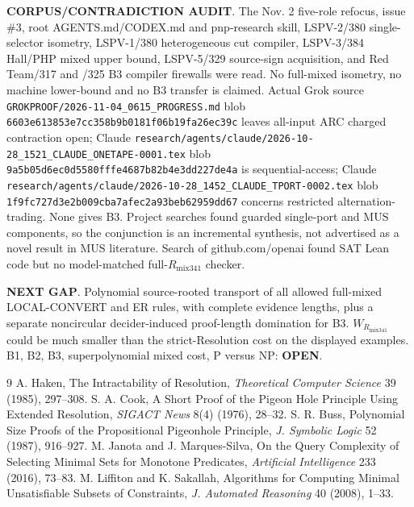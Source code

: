 \documentclass[11pt]{article}
\begin{document}
\noindent\textbf{CORPUS/CONTRADICTION AUDIT}. The Nov. 2 five-role refocus, issue \#3, root AGENTS.md/CODEX.md and pnp-research skill, LSPV-2/380 single-selector isometry, LSPV-1/380 heterogeneous cut compiler, LSPV-3/384 Hall/PHP mixed upper bound, LSPV-5/329 source-sign acquisition, and Red Team/317 and /325 B3 compiler firewalls were read. No full-mixed isometry, no machine lower-bound and no B3 transfer is claimed. Actual Grok source \texttt{GROKPROOF/2026-11-04\_0615\_PROGRESS.md} blob \texttt{6603e613853e7cc358b9b0181f06b19fa26ec39c} leaves all-input ARC charged contraction open; Claude \texttt{research/agents/claude/2026-10-28\_1521\_CLAUDE\_ONETAPE-0001.tex} blob \texttt{9a5b05d6ec0d5580fffe4687b82b4e3dd227de4a} is sequential-access; Claude \texttt{research/agents/claude/2026-10-28\_1452\_CLAUDE\_TPORT-0002.tex} blob \texttt{1f9fc727d3e2b009cba7afec2a93beb62959dd67} concerns restricted alternation-trading. None gives B3. Project searches found guarded single-port and MUS components, so the conjunction is an incremental synthesis, not advertised as a novel result in MUS literature. Search of github.com/openai found SAT Lean code but no model-matched full-$R_{\mathrm{mix341}}$ checker.

\noindent\textbf{NEXT GAP}. Polynomial source-rooted transport of all allowed full-mixed LOCAL-CONVERT and ER rules, with complete evidence lengths, plus a separate noncircular decider-induced proof-length domination for B3. $W_{R_{\mathrm{mix341}}}$ could be much smaller than the strict-Resolution cost on the displayed examples. B1, B2, B3, superpolynomial mixed cost, P versus NP: \textbf{OPEN}.

\begin{thebibliography}{9}
 A. Haken, The Intractability of Resolution, \emph{Theoretical Computer Science} 39 (1985), 297--308.
 S. A. Cook, A Short Proof of the Pigeon Hole Principle Using Extended Resolution, \emph{SIGACT News} 8(4) (1976), 28--32.
 S. R. Buss, Polynomial Size Proofs of the Propositional Pigeonhole Principle, \emph{J. Symbolic Logic} 52 (1987), 916--927.
 M. Janota and J. Marques-Silva, On the Query Complexity of Selecting Minimal Sets for Monotone Predicates, \emph{Artificial Intelligence} 233 (2016), 73--83.
 M. Liffiton and K. Sakallah, Algorithms for Computing Minimal Unsatisfiable Subsets of Constraints, \emph{J. Automated Reasoning} 40 (2008), 1--33.
\end{thebibliography}
\end{document}
